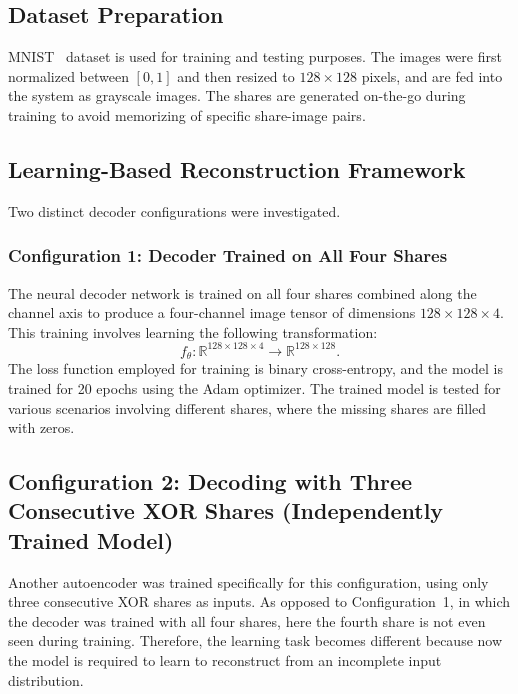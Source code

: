 \subsection{Dataset Preparation}

MNIST~\cite{lecun1998gradient} dataset is used for training and testing purposes.
The images were first normalized between $[0,1]$ and then resized to $128 \times 128$
pixels, and are fed into the system as grayscale images. The shares are generated on-the-go
during training to avoid memorizing of specific share-image pairs.

\subsection{Learning-Based Reconstruction Framework}

Two distinct decoder configurations were investigated.

\subsubsection{Configuration 1: Decoder Trained on All Four Shares}

The neural decoder network is trained on all four shares combined along the channel axis
to produce a four-channel image tensor of dimensions $128 \times 128 \times 4$. This
training involves learning the following transformation:
\begin{equation}
f_\theta : \mathbb{R}^{128 \times 128 \times 4} \rightarrow \mathbb{R}^{128 \times 128}.
\end{equation}
The loss function employed for training is binary cross-entropy, and the model is
trained for 20 epochs using the Adam optimizer. The trained
model is tested for various scenarios involving different shares, where the missing
shares are filled with zeros.

\subsection{Configuration 2: Decoding with Three Consecutive XOR Shares (Independently Trained Model)}

Another autoencoder was trained specifically for this configuration, using only three
consecutive XOR shares as inputs. As opposed to Configuration~1, in which the decoder
was trained with all four shares, here the fourth share is not even seen during training.
Therefore, the learning task becomes different because now the model is required to learn
to reconstruct from an incomplete input distribution.

